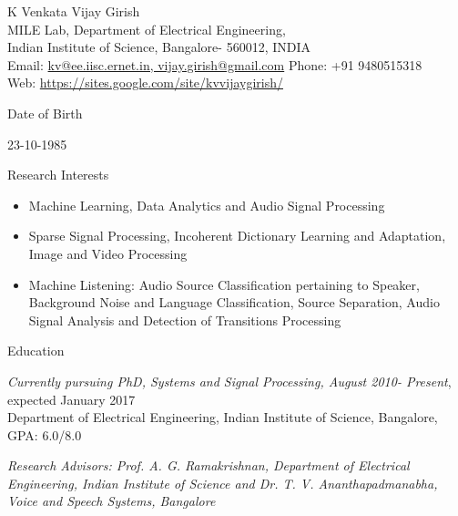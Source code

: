 \documentclass[10pt]{article}
\newenvironment{subbulletlist}{%
	\begin{list}{\labelitemii}{%
		\setlength{\topsep}{\itemsep}\setlength{\parskip}{\parsep}%
	}%
}%
{ \end{list} }
\begin{document}
\newlength{\oldcvlabelwidth}
\newlength{\oldcvlabelsep}

\begin{cv}{{\large K Venkata Vijay Girish}\\
{\normalsize  MILE Lab, Department of Electrical Engineering, \\Indian Institute of Science, Bangalore- 560012, INDIA
\\
Email: {\mdseries \href{mailto:vijay.girish@gmail.com}
	{kv@ee.iisc.ernet.in, vijay.girish@gmail.com}}
\hfill Phone: {\mdseries +91 9480515318} \hfill \\
Web: {\mdseries \href{https://sites.google.com/site/kvvijaygirish/}
	{https://sites.google.com/site/kvvijaygirish/}}}
}

\setlength{\oldcvlabelwidth}{\cvlabelwidth}
\setlength{\oldcvlabelsep}{\cvlabelsep}

\setlength{\cvlabelwidth}{1em}


\setlength{\cvlabelwidth}{0em}
\setlength{\cvlabelsep}{\labelsep}
\begin{cvlist}{Date of Birth}\item
23-10-1985
\end{cvlist}
\begin{cvlist}{Research Interests}\item
\begin{itemize}\itemsep=0.25em
 \item Machine Learning, Data Analytics and Audio Signal Processing
 
% 
\item Sparse Signal Processing, Incoherent Dictionary Learning and Adaptation, Image and Video  Processing
\item Machine Listening: Audio Source Classification pertaining to Speaker, Background Noise and Language Classification, Source Separation, Audio Signal Analysis and Detection of Transitions
Processing
\end{itemize}
\end{cvlist}


\begin{cvlist}{Education}
	\item \emph{Currently pursuing PhD, Systems and Signal Processing, August 2010- Present}, expected January 2017\\
	Department of Electrical
Engineering, Indian Institute of Science, Bangalore, GPA: 6.0/8.0
	\begin{subbulletlist}
		\item \emph{Research Advisors: Prof. A. G. Ramakrishnan, Department of Electrical Engineering, Indian Institute of Science and Dr. T. V. Ananthapadmanabha, Voice and Speech Systems, Bangalore
}
		

\end{subbulletlist}
\end{cvlist}
\end{cv}
\end{document}
